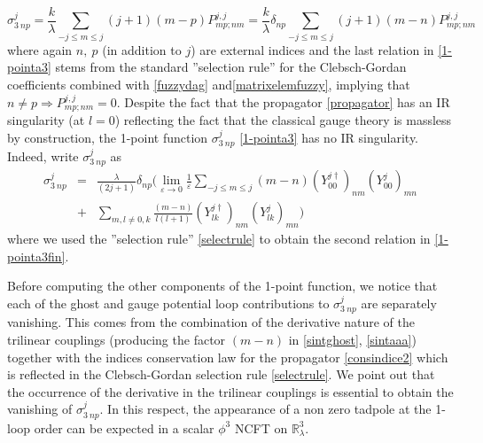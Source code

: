 \documentclass[11pt]{book}
\theoremstyle{break}
\begin{document}
\begin{equation}
\sigma^{j}_{3\ np}=\frac{k}{\lambda}\sum_{-j\le m\le j}(j+1)(m-p)P^{j,j}_{mp;nm}=\frac{k}{\lambda}\delta_{np}\sum_{-j\le m\le j}(j+1)(m-n)P^{j,j}_{mp;nm}\label{1-pointa3}
\end{equation}
where again $n,\ p$ (in addition to $j$) are external indices and the last relation in \eqref{1-pointa3} stems from the standard ''selection rule'' for the Clebsch-Gordan coefficients
combined with \eqref{fuzzydag} and\eqref{matrixelemfuzzy}, implying that $n\ne p\Rightarrow P^{j,j}_{mp;nm}=0$. Despite the fact that  the propagator \eqref{propagator} has an IR singularity (at $l=0$) reflecting the fact that the classical gauge theory is massless by construction, the 1-point function $\sigma^{j}_{3\ np}$ \eqref{1-pointa3} has no IR singularity. Indeed, write $\sigma^{j}_{3\ np}$ as
\begin{eqnarray}
\sigma^{j}_{3\ np}&=&\frac{\lambda}{(2j+1)}\delta_{np}\big(\lim_{\varepsilon\to0}\frac{1}{\varepsilon}\sum_{-j\le m\le j}(m-n)
(Y^{j\dag}_{00})_{nm}(Y^j_{00})_{mn}\nonumber\\
&+&\sum_{m,l\ne0,k}\frac{(m-n)}{l(l+1)}(Y^{j\dag}_{lk})_{nm}(Y^j_{lk})_{mn}\big)\label{ir-regul}
\end{eqnarray}
where we used the ''selection rule'' \eqref{selectrule} to obtain the second relation in \eqref{1-pointa3fin}. \par 
Before computing the other components of the 1-point function, we notice that each of the ghost and gauge potential loop contributions to $\sigma^{j}_{3\ np}$ are separately vanishing. This comes from the combination of the derivative nature of the trilinear couplings (producing the factor $(m-n)$ in \eqref{sintghost}, \eqref{sintaaa}) together with the indices conservation law for the propagator \eqref{consindice2} which is reflected in the Clebsch-Gordan selection rule \eqref{selectrule}. We point out that the occurrence of the derivative in the trilinear couplings is essential to obtain the vanishing of $\sigma^{j}_{3\ np}$. In this respect, the appearance of a non zero tadpole at the 1-loop order can be expected in a scalar $\phi^3$ NCFT on $\mathbb{R}^3_\lambda$.\par 
\end{document}
